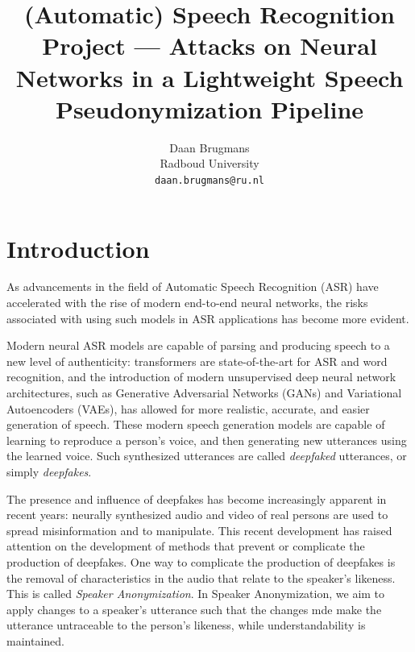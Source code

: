 \documentclass[11pt]{article}
\title{(Automatic) Speech Recognition Project --- Attacks on Neural Networks in a Lightweight Speech Pseudonymization Pipeline}
\author{Daan Brugmans \\
  Radboud University\\
  \texttt{daan.brugmans@ru.nl}
}
\begin{document}
\maketitle
        


\begin{abstract}
  
\end{abstract}

\section{Introduction}
As advancements in the field of Automatic Speech Recognition (ASR) have accelerated with the rise of modern end-to-end neural networks, the risks associated with using such models in ASR applications has become more evident.

Modern neural ASR models are capable of parsing and producing speech to a new level of authenticity: transformers are state-of-the-art for ASR and word recognition, and the introduction of modern unsupervised deep neural network architectures, such as Generative Adversarial Networks (GANs) and Variational Autoencoders (VAEs), has allowed for more realistic, accurate, and easier generation of speech.
These modern speech generation models are capable of learning to reproduce a person's voice, and then generating new utterances using the learned voice.
Such synthesized utterances are called \textit{deepfaked} utterances, or simply \textit{deepfakes}.

The presence and influence of deepfakes has become increasingly apparent in recent years: neurally synthesized audio and video of real persons are used to spread misinformation and to manipulate.
This recent development has raised attention on the development of methods that prevent or complicate the production of deepfakes.
One way to complicate the production of deepfakes is the removal of characteristics in the audio that relate to the speaker's likeness.
This is called \textit{Speaker Anonymization}.
In Speaker Anonymization, we aim to apply changes to a speaker's utterance such that the changes mde make the utterance untraceable to the person's likeness, while understandability is maintained.
\end{document}
